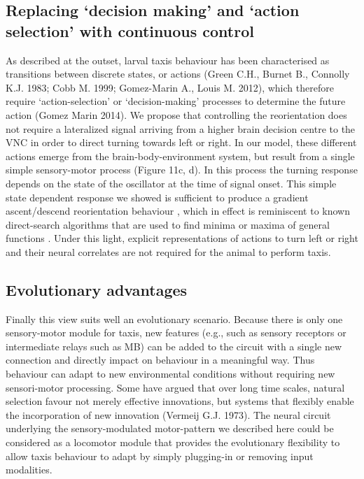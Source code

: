 \documentclass[10pt,a4paper]{article}
\begin{document}
\subsection{Replacing ‘decision making’ and ‘action selection’ with continuous control}
As described at the outset, larval taxis behaviour has been characterised as transitions between discrete states, or actions (Green C.H., Burnet B., Connolly K.J. 1983; Cobb M. 1999; Gomez-Marin A., Louis M. 2012), which therefore require ‘action-selection’ or ‘decision-making’ processes to determine the future action (Gomez Marin 2014).
  We propose that controlling the reorientation does not require a lateralized signal arriving from a higher brain decision centre to the VNC in order to direct turning towards left or right.
   In our model, these different actions emerge from the brain-body-environment system, but result from a single simple sensory-motor process (Figure 11c, d).
    In this process the turning response depends on the state of the oscillator at the time of signal onset. This simple state dependent response we showed is sufficient to produce a gradient ascent/descend reorientation behaviour \cite[see][ for example]{izquierdo2010evolution}, which in effect is reminiscent to known direct-search algorithms that are used to find minima or maxima of general functions \cite[see][]{snyman2005line}. 
Under this light, explicit representations of actions to turn left or right and their neural correlates are not required for the animal to perform taxis. 
  

\subsection{Evolutionary advantages}
Finally this view suits well an evolutionary scenario. 
Because there is only one sensory-motor module for taxis, new features (e.g., such as sensory receptors or intermediate relays such as MB) can be added to the circuit with a single new connection and directly impact on behaviour in a meaningful way. Thus behaviour can adapt to new environmental conditions  without requiring new sensori-motor processing. Some have argued that over long time scales, natural selection favour not merely effective innovations, but systems that flexibly enable the incorporation of new innovation (Vermeij G.J. 1973). The neural circuit underlying the sensory-modulated motor-pattern we described here could be considered as a locomotor module that provides the evolutionary flexibility to allow taxis behaviour to adapt by simply plugging-in or removing input modalities. 
\end{document}
